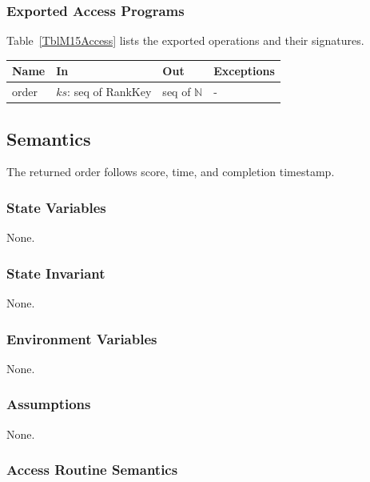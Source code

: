 \documentclass[12pt, titlepage]{article}
\begin{document}
\subsubsection{Exported Access Programs}

Table~\ref{TblM15Access} lists the exported operations and their signatures.

\begin{center}
\begin{minipage}{\textwidth}
\begin{tabularx}{\textwidth}{p{2.2cm} p{3.6cm} p{2.6cm} X}
\toprule
\textbf{Name} & \textbf{In} & \textbf{Out} & \textbf{Exceptions} \\
\midrule
order & $ks$: seq of RankKey & seq of $\mathbb{N}$ & - \\
\bottomrule
\end{tabularx}
\label{TblM15Access}
\end{minipage}
\end{center}

\subsection{Semantics}

The returned order follows score, time, and completion timestamp.

\subsubsection{State Variables}

None.

\subsubsection{State Invariant}

None.

\subsubsection{Environment Variables}

None.

\subsubsection{Assumptions}

None.

\subsubsection{Access Routine Semantics}
\end{document}
